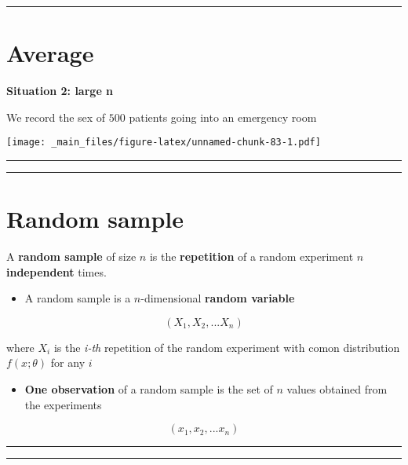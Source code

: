 \documentclass[
]{book}
\providecommand{\tightlist}{%
  \setlength{\itemsep}{0pt}\setlength{\parskip}{0pt}}
\begin{document}
\begin{center}\rule{0.5\linewidth}{0.5pt}\end{center}

\hypertarget{average-7}{%
\section{Average}\label{average-7}}

\textbf{Situation 2: large n}

We record the sex of \(500\) patients going into an emergency room

\texttt{[image: \_main\_files/figure-latex/unnamed-chunk-83-1.pdf]}

\begin{center}\rule{0.5\linewidth}{0.5pt}\end{center}

\begin{center}\rule{0.5\linewidth}{0.5pt}\end{center}

\hypertarget{random-sample-1}{%
\section{Random sample}\label{random-sample-1}}

A \textbf{random sample} of size \(n\) is the \textbf{repetition} of a random experiment \(n\) \textbf{independent} times.

\begin{itemize}
\tightlist
\item
  A random sample is a \(n\)-dimensional \textbf{random variable}
\end{itemize}

\[(X_1, X_2, ... X_n)\]

where \(X_i\) is the \emph{i-th} repetition of the random experiment with comon distribution \(f(x; \theta)\) for any \(i\)

\begin{itemize}
\tightlist
\item
  \textbf{One observation} of a random sample is the set of \(n\) values obtained from the experiments
\end{itemize}

\[(x_1, x_2, ... x_n)\]

\begin{center}\rule{0.5\linewidth}{0.5pt}\end{center}

\begin{center}\rule{0.5\linewidth}{0.5pt}\end{center}
\end{document}
